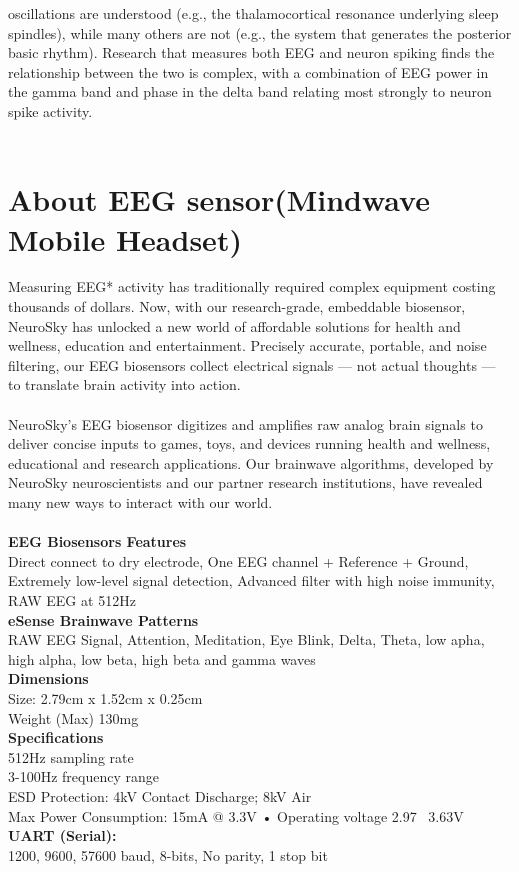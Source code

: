 \documentclass[a4 paper,12pt]{article}
\begin{document}
\begin{minipage}{0.98\textwidth}
oscillations are understood (e.g., the thalamocortical resonance underlying sleep spindles), while many others are not (e.g., the system that generates the posterior basic rhythm). Research that measures both EEG and neuron spiking finds the relationship between the two is complex, with a combination of EEG power in the gamma band and phase in the delta band relating most strongly to neuron spike activity.\\\\
\end{minipage}
	
	
\begin{minipage}{0.98\textwidth}
	\section{About EEG sensor(Mindwave Mobile Headset)}
	\vspace{-0.1in}
Measuring EEG* activity has traditionally required complex equipment costing thousands of dollars. Now, with our research-grade, embeddable biosensor, NeuroSky has unlocked a new world of affordable solutions for health and wellness, education and entertainment. Precisely accurate, portable, and noise filtering, our EEG biosensors collect electrical signals — not actual thoughts — to translate brain activity into action.\\\\NeuroSky’s EEG biosensor digitizes and amplifies raw analog brain signals to deliver concise inputs to games, toys, and devices running health and wellness, educational and research applications. Our brainwave algorithms, developed by NeuroSky neuroscientists and our partner research institutions, have revealed many new ways to interact with our world.\\\\\textbf{EEG Biosensors Features}\\
Direct connect to dry electrode, One EEG channel + Reference + Ground, Extremely low-level signal detection, Advanced filter with high noise immunity, RAW EEG at 512Hz\\
\textbf{eSense Brainwave Patterns}\\
RAW EEG Signal, Attention, Meditation, Eye Blink, Delta, Theta, low apha, high alpha, low beta, high beta and gamma waves\\
\textbf{Dimensions}\\
Size: 2.79cm x 1.52cm x 0.25cm\\Weight (Max) 130mg\\
\textbf{Specifications}\\
512Hz sampling rate\\
3-100Hz frequency range\\
ESD Protection: 4kV Contact Discharge; 8kV Air\\
Max Power Consumption: 15mA @ 3.3V • Operating voltage 2.97 ~3.63V\\
\textbf{UART (Serial):}\\
1200, 9600, 57600 baud, 8-bits, No parity, 1 stop bit
\end{minipage}
\end{document}
